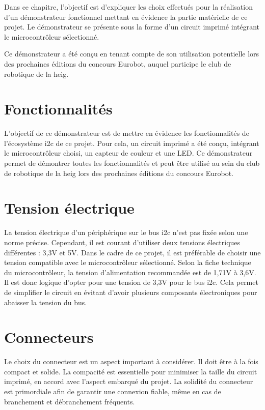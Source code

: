 Dans ce chapitre, l'objectif est d'expliquer les choix effectués pour la réalisation d'un démonstrateur fonctionnel mettant en évidence la partie matérielle de ce projet.
Le démonstrateur se présente sous la forme d'un circuit imprimé intégrant le microcontrôleur sélectionné.

Ce démonstrateur a été conçu en tenant compte de son utilisation potentielle lors des prochaines éditions du concours Eurobot, auquel participe le club de robotique de la \gls{heig}.

\section{Fonctionnalités}

L'objectif de ce démonstrateur est de mettre en évidence les fonctionnalités de l'écosystème \gls{i2c} de ce projet.
Pour cela, un circuit imprimé a été conçu, intégrant le microcontrôleur choisi, un capteur de couleur et une LED.
Ce démonstrateur permet de démontrer toutes les fonctionnalités et peut être utilisé au sein du club de robotique de la \gls{heig} lors des prochaines éditions du concours Eurobot.

\section{Tension électrique}

La tension électrique d'un périphérique sur le bus \gls{i2c} n'est pas fixée selon une norme précise.
Cependant, il est courant d'utiliser deux tensions électriques différentes : 3,3V et 5V.
Dans le cadre de ce projet, il est préférable de choisir une tension compatible avec le microcontrôleur sélectionné.
Selon la fiche technique du microcontrôleur, la tension d'alimentation recommandée est de 1,71V à 3,6V.
Il est donc logique d'opter pour une tension de 3,3V pour le bus \gls{i2c}.
Cela permet de simplifier le circuit en évitant d'avoir plusieurs composants électroniques pour abaisser la tension du bus.

\section{Connecteurs}

Le choix du connecteur est un aspect important à considérer.
Il doit être à la fois compact et solide.
La compacité est essentielle pour minimiser la taille du circuit imprimé, en accord avec l'aspect embarqué du projet.
La solidité du connecteur est primordiale afin de garantir une connexion fiable, même en cas de branchement et débranchement fréquents.

